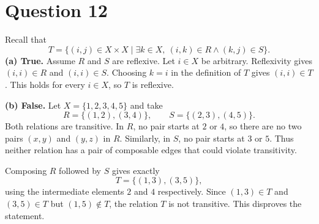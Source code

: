 \documentclass[11pt,a4paper]{article}
\newcommand{\question}[1]{\Needspace{6\baselineskip}\section*{Question #1}}
\begin{document}
\question{12}
Recall that
\[
T=\{(i,j)\in X\times X\mid\exists k\in X,\ (i,k)\in R\wedge(k,j)\in S\}.
\]
\textbf{(a) True.} Assume $R$ and $S$ are reflexive. Let $i\in X$ be arbitrary. Reflexivity gives $(i,i)\in R$ and $(i,i)\in S$. Choosing $k=i$ in the definition of $T$ gives $(i,i)\in T$. This holds for every $i\in X$, so $T$ is reflexive.

\textbf{(b) False.} Let $X=\{1,2,3,4,5\}$ and take
\[
R=\{(1,2),(3,4)\},\qquad S=\{(2,3),(4,5)\}.
\]
Both relations are transitive. In $R$, no pair starts at $2$ or $4$, so there are no two pairs $(x,y)$ and $(y,z)$ in $R$. Similarly, in $S$, no pair starts at $3$ or $5$. Thus neither relation has a pair of composable edges that could violate transitivity.

Composing $R$ followed by $S$ gives exactly
\[
T=\{(1,3),(3,5)\},
\]
using the intermediate elements $2$ and $4$ respectively. Since $(1,3)\in T$ and $(3,5)\in T$ but $(1,5)\notin T$, the relation $T$ is not transitive. This disproves the statement.
\end{document}
